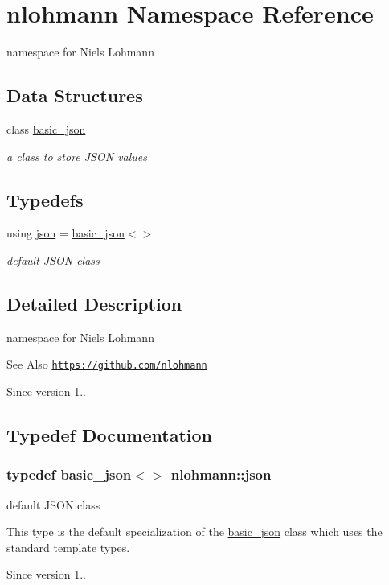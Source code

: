 \hypertarget{namespacenlohmann}{\section{nlohmann Namespace Reference}
\label{namespacenlohmann}
}


namespace for Niels Lohmann  


\subsection*{Data Structures}
\begin{DoxyCompactItemize}
\item 
class \hyperlink{classnlohmann_1_1basic__json}{basic\-\_\-json}
\begin{DoxyCompactList}\small\item\em a class to store J\-S\-O\-N values \end{DoxyCompactList}\end{DoxyCompactItemize}
\subsection*{Typedefs}
\begin{DoxyCompactItemize}
\item 
using \hyperlink{namespacenlohmann_a9cc9a3033850a092f791d86854d117fc_a9cc9a3033850a092f791d86854d117fc}{json} = \hyperlink{classnlohmann_1_1basic__json}{basic\-\_\-json}$<$$>$
\begin{DoxyCompactList}\small\item\em default J\-S\-O\-N class \end{DoxyCompactList}\end{DoxyCompactItemize}


\subsection{Detailed Description}
namespace for Niels Lohmann \begin{DoxySeeAlso}{See Also}
\href{https://github.com/nlohmann}{\tt https\-://github.\-com/nlohmann} 
\end{DoxySeeAlso}
\begin{DoxySince}{Since}
version 1.. 
\end{DoxySince}


\subsection{Typedef Documentation}
\hypertarget{namespacenlohmann_a9cc9a3033850a092f791d86854d117fc_a9cc9a3033850a092f791d86854d117fc}{
\subsubsection[{json}]{\setlength{\rightskip}{0pt plus 5cm}typedef {\bf basic\-\_\-json}$<$$>$ {\bf nlohmann\-::json}}}\label{namespacenlohmann_a9cc9a3033850a092f791d86854d117fc_a9cc9a3033850a092f791d86854d117fc}


default J\-S\-O\-N class 

This type is the default specialization of the \hyperlink{classnlohmann_1_1basic__json}{basic\-\_\-json} class which uses the standard template types.

\begin{DoxySince}{Since}
version 1.. 
\end{DoxySince}
